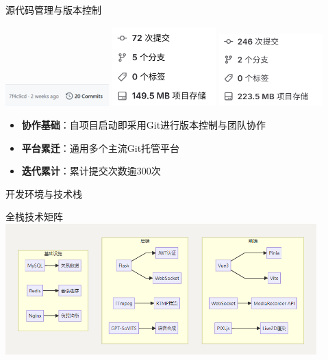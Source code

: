 \documentclass{beamer}
\begin{document}
\begin{frame}{源代码管理与版本控制}
    \begin{center}
        \includegraphics[width=0.3\textwidth]{pic/git1.png}
        \hfill  %
        \includegraphics[width=0.3\textwidth]{pic/git2.png}
        \hfill
        \includegraphics[width=0.3\textwidth]{pic/git3.png}
    \end{center}

    \vspace{0.5cm}  %

    \begin{itemize}
        \item \textbf{协作基础}：自项目启动即采用Git进行版本控制与团队协作
        \item \textbf{平台累迁}：通用多个主流Git托管平台
        \item \textbf{迭代累计}：累计提交次数逾300次
    \end{itemize}
\end{frame}

\begin{frame}{开发环境与技术栈}
    \begin{block}{全栈技术矩阵}
        \centering
        \includegraphics[width=0.9\textwidth]{pic/tech_stack.png}
    \end{block}
\end{frame}
\end{document}
